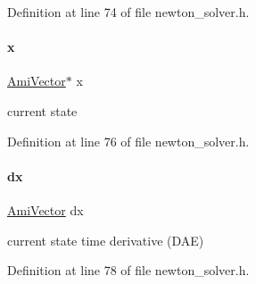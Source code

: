 Definition at line 74 of file newton\+\_\+solver.\+h.

\mbox{\label{classamici_1_1_newton_solver_af64268982dd7b9be1690573763982e0b}} 
\paragraph{\texorpdfstring{x}{x}}
{\footnotesize\ttfamily \mbox{\hyperlink{classamici_1_1_ami_vector}{Ami\+Vector}}$\ast$ x\hspace{0.3cm}{\ttfamily [protected]}}

current state 

Definition at line 76 of file newton\+\_\+solver.\+h.

\mbox{\label{classamici_1_1_newton_solver_a17e4770df418fc1f2c4283d7e188d81d}} 
\paragraph{\texorpdfstring{dx}{dx}}
{\footnotesize\ttfamily \mbox{\hyperlink{classamici_1_1_ami_vector}{Ami\+Vector}} dx\hspace{0.3cm}{\ttfamily [protected]}}

current state time derivative (D\+AE) 

Definition at line 78 of file newton\+\_\+solver.\+h.

